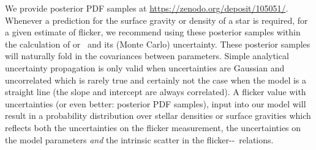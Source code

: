 We provide posterior PDF samples at \url{https://zenodo.org/deposit/105051/}.
Whenever a prediction for the surface gravity or density of a star is required,
for a given estimate of flicker, we recommend using these posterior samples
within the calculation of \rhostar or \logg\ and its (Monte Carlo)
uncertainty.
These posterior samples will naturally fold in the covariances between
parameters.
Simple analytical uncertainty propagation is only valid when uncertainties are
Gaussian and uncorrelated which is rarely true and certainly not the case when
the model is a straight line (the slope and intercept are always
correlated).
A flicker value with uncertainties (or even better: posterior PDF
samples), input into our model will result in a probability distribution over
stellar densities or surface gravities which reflects both the uncertainties
on the flicker measurement, the uncertainties on the model parameters {\it and}
the intrinsic scatter in the flicker-\rhostar-\logg\ relations.
